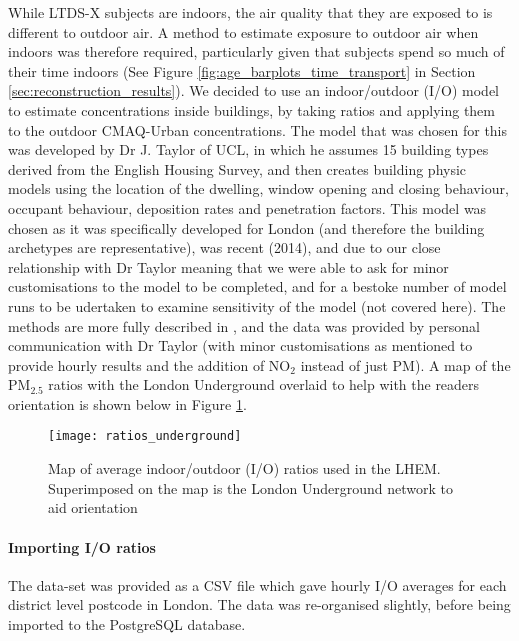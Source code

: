 While LTDS-X subjects are indoors, the air quality that they are exposed to is different to outdoor air. A method to estimate exposure to outdoor air when indoors was therefore required, particularly given that subjects spend so much of their time indoors (See Figure \ref{fig:age_barplots_time_transport} in Section \ref{sec:reconstruction_results}). We decided to use an indoor/outdoor (I/O) model to estimate concentrations inside buildings, by taking ratios and applying them to the outdoor CMAQ-Urban concentrations. The model that was chosen for this was developed by Dr J. Taylor of UCL, in which he assumes 15 building types derived from the English Housing Survey, and then creates building physic models using the location of the dwelling, window opening and closing behaviour, occupant behaviour, deposition rates and penetration factors. This model was chosen as it was specifically developed for London (and therefore the building archetypes are representative), was recent (2014), and due to our close relationship with Dr Taylor meaning that we were able to ask for minor customisations to the model to be completed, and for a bestoke number of model runs to be udertaken to examine sensitivity of the model (not covered here). The methods are more fully described in \cite{Taylor2014}, and the data was  provided by personal communication with Dr Taylor (with minor customisations as mentioned  to provide hourly results and the addition of NO$_{2}$ instead of just PM). A map of the PM$_{2.5}$ ratios with the London Underground overlaid to help with the readers orientation is shown below in Figure \ref{fig:ratios_underground}.

\begin{figure}[H]
\centering
\texttt{[image: ratios\_underground]}
\caption{Map of average indoor/outdoor (I/O) ratios used in the LHEM. Superimposed on the map is the London Underground network to aid orientation}
\label{fig:ratios_underground}
\end{figure}

            \paragraph{Importing I/O ratios}
            \label{sec:importing_io_ratios}
	
The data-set was provided as a CSV file which gave hourly I/O averages for each district level postcode in London. The data was re-organised slightly, before being imported to the PostgreSQL database.

